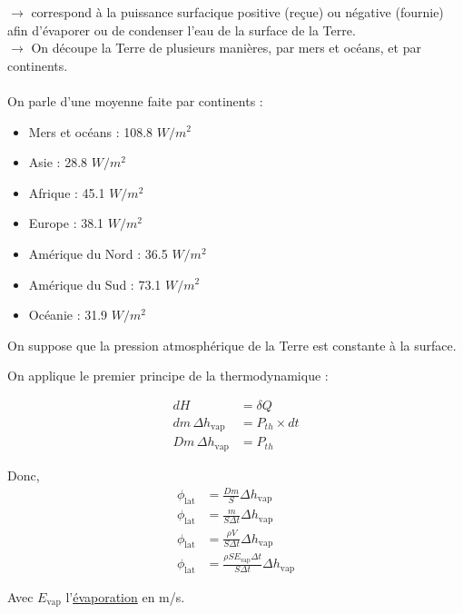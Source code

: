 \documentclass[a4paper,12pt]{article}
\begin{document}
$\rightarrow$ correspond à la puissance surfacique positive (reçue) ou négative (fournie) afin d'évaporer ou de condenser l'eau de la surface de la Terre.\\

$\rightarrow$ On découpe la Terre de plusieurs manières, par mers et océans, et par continents.\\[0.5em]


\\
On parle d'une moyenne faite par continents :

\begin{itemize}
    \item Mers et océans : 108.8 $W/m^2$
    \item Asie : 28.8 $W/m^2$
    \item Afrique : 45.1 $W/m^2$
    \item Europe : 38.1 $W/m^2$
    \item Amérique du Nord : 36.5 $W/m^2$
    \item Amérique du Sud : 73.1 $W/m^2$
    \item Océanie : 31.9 $W/m^2$
\end{itemize}

On suppose que la pression atmosphérique de la Terre est constante à la surface. 

\vspace{0.5cm}
On applique le premier principe de la thermodynamique :

\vspace{0.5cm}
\begin{align*}
    dH &= \delta Q \\
    dm \, \Delta h_{\text{vap}} &= P_{th} \times dt \\
    Dm \, \Delta h_{\text{vap}} &= P_{th}
\end{align*}

Donc, 
\begin{align*}
    \phi_{\text{lat}} &= \frac{Dm}{S} \Delta h_{\text{vap}} \\
    \phi_{\text{lat}} &= \frac{m}{S \Delta t} \Delta h_{\text{vap}} \\
    \phi_{\text{lat}} &= \frac{\rho V}{S \Delta t} \Delta h_{\text{vap}} \\
    \phi_{\text{lat}} &= \boxed{\frac{\rho S E_{\text{vap}} \Delta t}{S \Delta t} \Delta h_{\text{vap}}}
\end{align*}






Avec \( E_{\mathrm{vap}} \) l'\href{https://environmentofearth.wordpress.com/2008/03/11/water-balance/?}{évaporation} en m/s.
\end{document}
